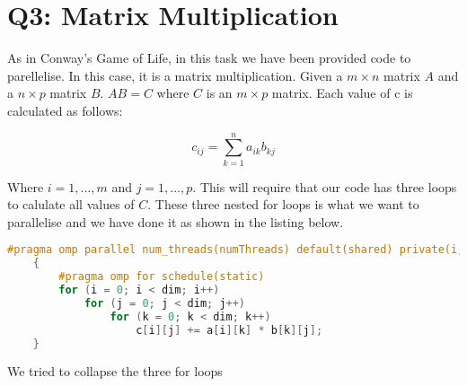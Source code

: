 \section{Q3: Matrix Multiplication}

As in Conway's Game of Life, in this task we have been provided code to parellelise.
In this case, it is a matrix multiplication. Given a $m \times n$ matrix $A$ and
a $n \times p$ matrix $B$. $AB = C$ where $C$ is an $m \times p$ matrix. Each value
of c is calculated as follows:

\begin{equation}
    c_{ij} = \sum_{k=1}^{n} a_{ik}b_{kj}
\end{equation}

Where $i = 1, \dots, m$ and $j = 1, \dots, p$. This will require that our code 
has three loops to calulate all values of $C$. These three nested for loops 
is what we want to parallelise and we have done it as shown in the listing below.

\begin{lstlisting}[language=C++]
    #pragma omp parallel num_threads(numThreads) default(shared) private(i, j, k)
    {
        #pragma omp for schedule(static)
        for (i = 0; i < dim; i++)
            for (j = 0; j < dim; j++)
                for (k = 0; k < dim; k++)
                    c[i][j] += a[i][k] * b[k][j];
    }
\end{lstlisting}

We tried to collapse the three for loops 
